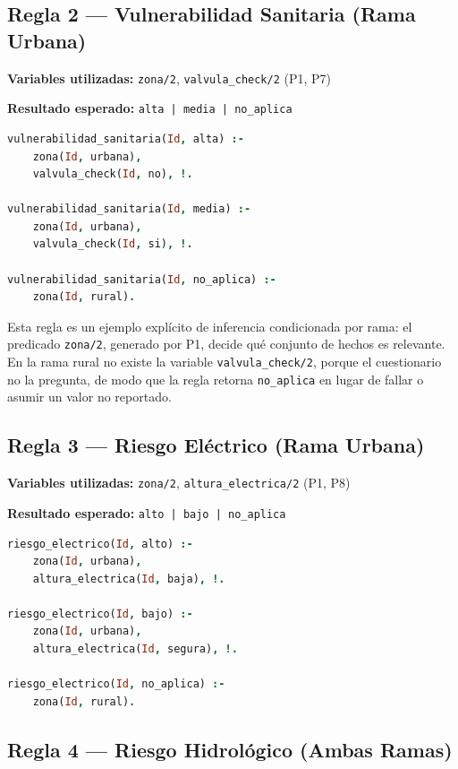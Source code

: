 \documentclass[12pt, letterpaper]{article}
\begin{document}
\subsection{Regla 2 — Vulnerabilidad Sanitaria (Rama Urbana)}

\textbf{Variables utilizadas:} \texttt{zona/2}, \texttt{valvula\_check/2} (P1, P7)

\textbf{Resultado esperado:} \texttt{alta | media | no\_aplica}

\begin{lstlisting}[language=Prolog, caption={Reglas de vulnerabilidad sanitaria}]
vulnerabilidad_sanitaria(Id, alta) :-
    zona(Id, urbana),
    valvula_check(Id, no), !.

vulnerabilidad_sanitaria(Id, media) :-
    zona(Id, urbana),
    valvula_check(Id, si), !.

vulnerabilidad_sanitaria(Id, no_aplica) :-
    zona(Id, rural).
\end{lstlisting}

Esta regla es un ejemplo explícito de inferencia condicionada por rama: el predicado \texttt{zona/2}, generado por P1, decide qué conjunto de hechos es relevante. En la rama rural no existe la variable \texttt{valvula\_check/2}, porque el cuestionario no la pregunta, de modo que la regla retorna \texttt{no\_aplica} en lugar de fallar o asumir un valor no reportado.

\subsection{Regla 3 — Riesgo Eléctrico (Rama Urbana)}

\textbf{Variables utilizadas:} \texttt{zona/2}, \texttt{altura\_electrica/2} (P1, P8)

\textbf{Resultado esperado:} \texttt{alto | bajo | no\_aplica}

\begin{lstlisting}[language=Prolog, caption={Reglas de riesgo eléctrico}]
riesgo_electrico(Id, alto) :-
    zona(Id, urbana),
    altura_electrica(Id, baja), !.

riesgo_electrico(Id, bajo) :-
    zona(Id, urbana),
    altura_electrica(Id, segura), !.

riesgo_electrico(Id, no_aplica) :-
    zona(Id, rural).
\end{lstlisting}

\subsection{Regla 4 — Riesgo Hidrológico (Ambas Ramas)}
\end{document}
